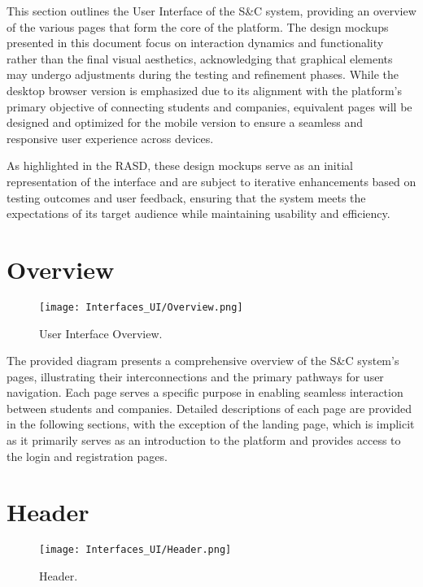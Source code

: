 This section outlines the User Interface of the S\&C system, providing an overview of the various pages that form the core of the platform. The design mockups presented in this document focus on interaction dynamics and functionality rather than the final visual aesthetics, acknowledging that graphical elements may undergo adjustments during the testing and refinement phases. While the desktop browser version is emphasized due to its alignment with the platform's primary objective of connecting students and companies, equivalent pages will be designed and optimized for the mobile version to ensure a seamless and responsive user experience across devices.

As highlighted in the RASD, these design mockups serve as an initial representation of the interface and are subject to iterative enhancements based on testing outcomes and user feedback, ensuring that the system meets the expectations of its target audience while maintaining usability and efficiency.


\section{Overview}

\begin{figure}[H]
    \begin{center}
        \texttt{[image: Interfaces\_UI/Overview.png]}
        \caption{User Interface Overview.}
        \label{fig:user_interface_overview}%
    \end{center}
\end{figure}

The provided diagram presents a comprehensive overview of the S\&C system’s pages, illustrating their interconnections and the primary pathways for user navigation. Each page serves a specific purpose in enabling seamless interaction between students and companies. Detailed descriptions of each page are provided in the following sections, with the exception of the landing page, which is implicit as it primarily serves as an introduction to the platform and provides access to the login and registration pages.


\section{Header}

\begin{figure}[H]
    \begin{center}
        \texttt{[image: Interfaces\_UI/Header.png]}
        \caption{Header.}
        \label{fig:header}%
    \end{center}
\end{figure}

